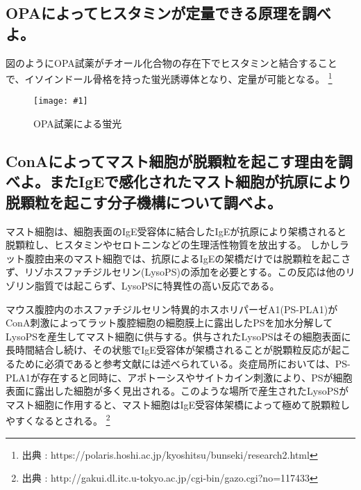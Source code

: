 \documentclass[a4paper,papersize,dvipdfmx]{jsarticle}
\newcommand{\piccap}[3]{\begin{figure}[H] \centering \texttt{[image: \#1]} \caption{#3} \label{fig {#1}} \end{figure}} %
\begin{document}
\subsection*{OPAによってヒスタミンが定量できる原理を調べよ。}
図のようにOPA試薬がチオール化合物の存在下でヒスタミンと結合することで、イソインドール骨格を持った蛍光誘導体となり、定量が可能となる。
\footnote{
出典 : https://polaris.hoshi.ac.jp/kyoshitsu/bunseki/research2.html
}
\piccap{images/opa.png}{10}{OPA試薬による蛍光}

\subsection*{ConAによってマスト細胞が脱顆粒を起こす理由を調べよ。またIgEで感化されたマスト細胞が抗原により脱顆粒を起こす分子機構について調べよ。}
マスト細胞は、細胞表面のIgE受容体に結合したIgEが抗原により架橋されると脱顆粒し、ヒスタミンやセロトニンなどの生理活性物質を放出する。
しかしラット腹腔由来のマスト細胞では、抗原によるIgEの架橋だけでは脱顆粒を起こさず、リゾホスファチジルセリン(LysoPS)の添加を必要とする。この反応は他のリゾリン脂質では起こらず、LysoPSに特異性の高い反応である。

マウス腹腔内のホスファチジルセリン特異的ホスホリパーゼA1(PS-PLA1)がConA刺激によってラット腹腔細胞の細胞膜上に露出したPSを加水分解してLysoPSを産生してマスト細胞に供与する。供与されたLysoPSはその細胞表面に長時間結合し続け、その状態でIgE受容体が架橋されることが脱顆粒反応が起こるために必須であると参考文献には述べられている。炎症局所においては、PS-PLA1が存在すると同時に、アポトーシスやサイトカイン刺激により、PSが細胞表面に露出した細胞が多く見出される。このような場所で産生されたLysoPSがマスト細胞に作用すると、マスト細胞はIgE受容体架橋によって極めて脱顆粒しやすくなるとされる。
\footnote{
出典 : http://gakui.dl.itc.u-tokyo.ac.jp/cgi-bin/gazo.cgi?no=117433
}
\end{document}
